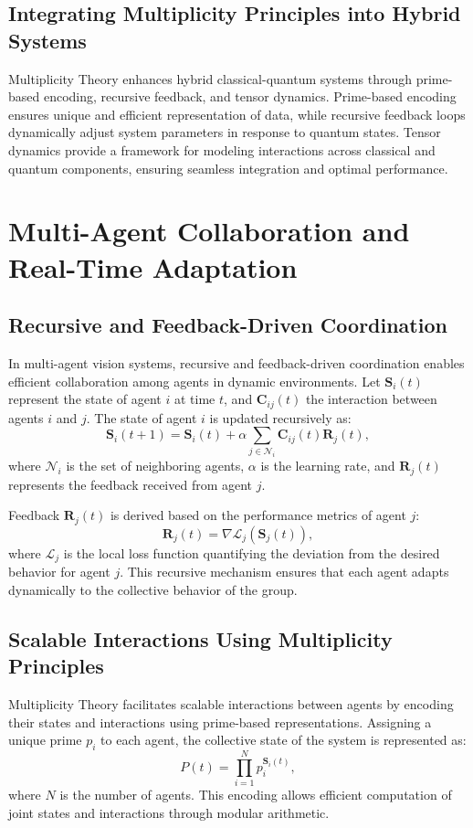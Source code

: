 \documentclass{article}
\theoremstyle{plain}
\begin{document}
\subsection{Integrating Multiplicity Principles into Hybrid Systems}
Multiplicity Theory enhances hybrid classical-quantum systems through prime-based encoding, recursive feedback, and tensor dynamics. Prime-based encoding ensures unique and efficient representation of data, while recursive feedback loops dynamically adjust system parameters in response to quantum states. Tensor dynamics provide a framework for modeling interactions across classical and quantum components, ensuring seamless integration and optimal performance.

\section{Multi-Agent Collaboration and Real-Time Adaptation}

\subsection{Recursive and Feedback-Driven Coordination}
In multi-agent vision systems, recursive and feedback-driven coordination enables efficient collaboration among agents in dynamic environments. Let \( \mathbf{S}_i(t) \) represent the state of agent \( i \) at time \( t \), and \( \mathbf{C}_{ij}(t) \) the interaction between agents \( i \) and \( j \). The state of agent \( i \) is updated recursively as:
\begin{equation}
\mathbf{S}_i(t+1) = \mathbf{S}_i(t) + \alpha \sum_{j \in \mathcal{N}_i} \mathbf{C}_{ij}(t) \mathbf{R}_j(t),
\end{equation}
where \( \mathcal{N}_i \) is the set of neighboring agents, \( \alpha \) is the learning rate, and \( \mathbf{R}_j(t) \) represents the feedback received from agent \( j \).

Feedback \( \mathbf{R}_j(t) \) is derived based on the performance metrics of agent \( j \):
\begin{equation}
\mathbf{R}_j(t) = \nabla \mathcal{L}_j(\mathbf{S}_j(t)),
\end{equation}
where \( \mathcal{L}_j \) is the local loss function quantifying the deviation from the desired behavior for agent \( j \). This recursive mechanism ensures that each agent adapts dynamically to the collective behavior of the group.

\subsection{Scalable Interactions Using Multiplicity Principles}
Multiplicity Theory facilitates scalable interactions between agents by encoding their states and interactions using prime-based representations. Assigning a unique prime \( p_i \) to each agent, the collective state of the system is represented as:
\begin{equation}
P(t) = \prod_{i=1}^N p_i^{\mathbf{S}_i(t)},
\end{equation}
where \( N \) is the number of agents. This encoding allows efficient computation of joint states and interactions through modular arithmetic.
\end{document}
